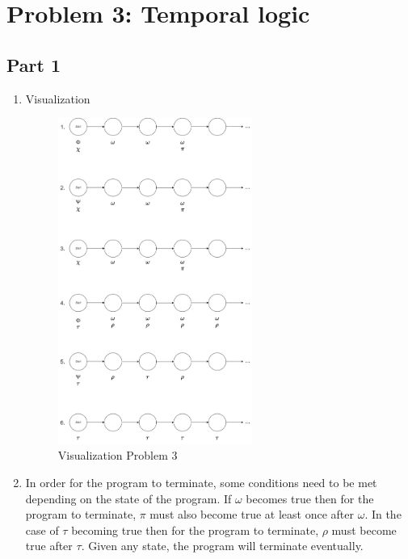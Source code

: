\documentclass[12pt]{article}
\begin{document}
\section*{Problem 3: Temporal logic}
\subsection*{Part 1}
\begin{enumerate}
	\item Visualization
	\begin{figure}[htbp]
		\centering
		\includegraphics[width=0.60\textwidth]{SOEN331_A1_P311.PNG}
		\caption{Visualization Problem 3}
	\end{figure}
	
	\newpage
	\item In order for the program to terminate, some conditions need to be met depending on the state of the program. If $\omega$ becomes true then for the program to terminate, $\pi$ must also become true at least once after $\omega$. In the case of $\tau$ becoming true then for the program to terminate, $\rho$ must become true after $\tau$. Given any state, the program will terminate eventually.
	 
\end{enumerate}
\end{document}
